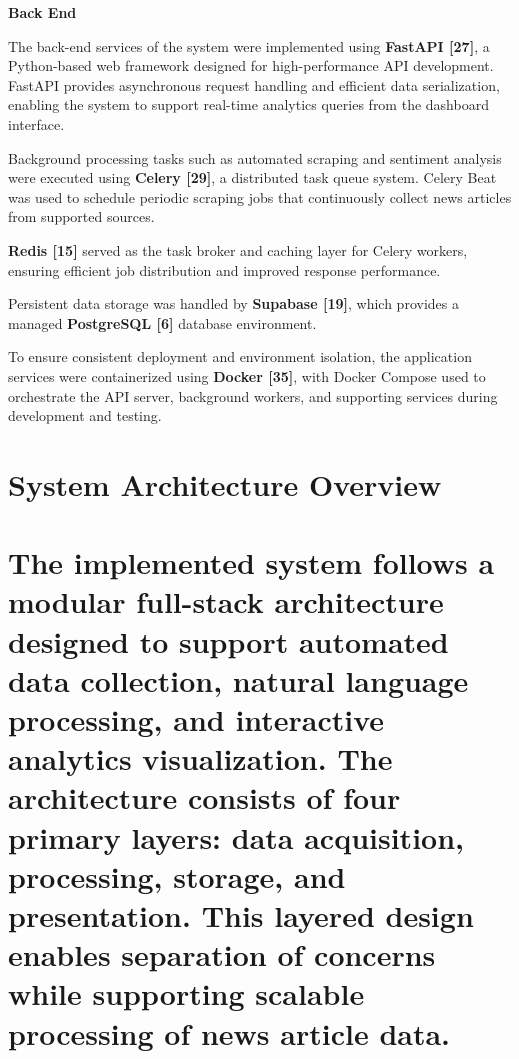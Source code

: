 \textbf{Back End}

The back-end services of the system were implemented using \textbf{FastAPI {[}27{]}}, a Python-based web framework designed for high-performance API development. FastAPI provides asynchronous request handling and efficient data serialization, enabling the system to support real-time analytics queries from the dashboard interface.

Background processing tasks such as automated scraping and sentiment analysis were executed using \textbf{Celery {[}29{]}}, a distributed task queue system. Celery Beat was used to schedule periodic scraping jobs that continuously collect news articles from supported sources.

\textbf{Redis {[}15{]}} served as the task broker and caching layer for Celery workers, ensuring efficient job distribution and improved response performance.

Persistent data storage was handled by \textbf{Supabase {[}19{]}}, which provides a managed \textbf{PostgreSQL {[}6{]}} database environment.

To ensure consistent deployment and environment isolation, the application services were containerized using \textbf{Docker {[}35{]}}, with Docker Compose used to orchestrate the API server, background workers, and supporting services during development and testing.

\section{\texorpdfstring{\textbf{System Architecture Overview}}{System Architecture Overview}}\label{system-architecture-overview}

\section{The implemented system follows a modular full-stack architecture designed to support automated data collection, natural language processing, and interactive analytics visualization. The architecture consists of four primary layers: data acquisition, processing, storage, and presentation. This layered design enables separation of concerns while supporting scalable processing of news article data.}\label{the-implemented-system-follows-a-modular-full-stack-architecture-designed-to-support-automated-data-collection-natural-language-processing-and-interactive-analytics-visualization.-the-architecture-consists-of-four-primary-layers-data-acquisition-processing-storage-and-presentation.-this-layered-design-enables-separation-of-concerns-while-supporting-scalable-processing-of-news-article-data.}

